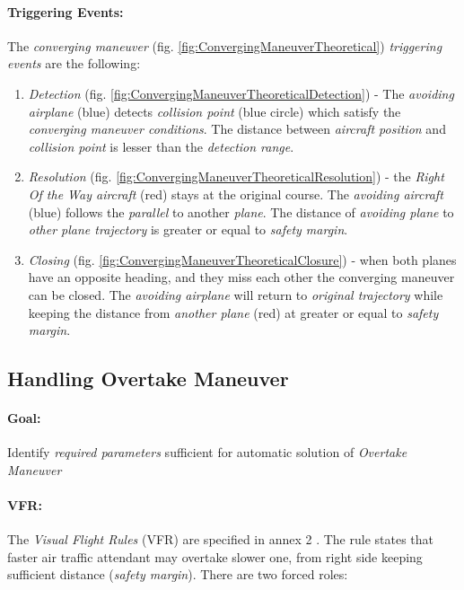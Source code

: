 \paragraph{Triggering Events:} The \emph{converging maneuver} (fig. \ref{fig:ConvergingManeuverTheoretical}) \emph{triggering events} are the following:

\begin{enumerate}
    \item \emph{Detection} (fig. \ref{fig:ConvergingManeuverTheoreticalDetection}) -  The \emph{avoiding airplane} (blue) detects \emph{collision point} (blue circle) which satisfy the \emph{converging maneuver conditions}. The distance between \emph{aircraft position} and \emph{collision point} is lesser than the \emph{detection range}.
    
    \item \emph{Resolution} (fig. \ref{fig:ConvergingManeuverTheoreticalResolution}) - the \emph{Right Of the Way aircraft} (red) stays at the original course. The \emph{avoiding aircraft} (blue) follows the \emph{parallel} to another \emph{plane}. The distance of \emph{avoiding plane} to \emph{other plane trajectory} is greater or equal to \emph{safety margin}.
    
    \item \emph{Closing} (fig. \ref{fig:ConvergingManeuverTheoreticalClosure}) - when both planes have an opposite heading, and they miss each other the converging maneuver can be closed. The \emph{avoiding airplane} will return to \emph{original trajectory}  while keeping the distance from \emph{another plane} (red) at greater or equal to \emph{safety margin}.
\end{enumerate}


\subsection{Handling Overtake Maneuver}\label{sec:handlingOvertakeManuever}

\paragraph{Goal:} Identify \emph{required parameters} sufficient for automatic solution of \emph{Overtake Maneuver}

\paragraph{VFR:} The \emph{Visual Flight Rules} (VFR) are specified in annex 2 \cite{icaoAnnex2}. The rule states that faster air traffic attendant may overtake slower one, from right side keeping sufficient distance (\emph{safety margin}). There are two forced roles:

